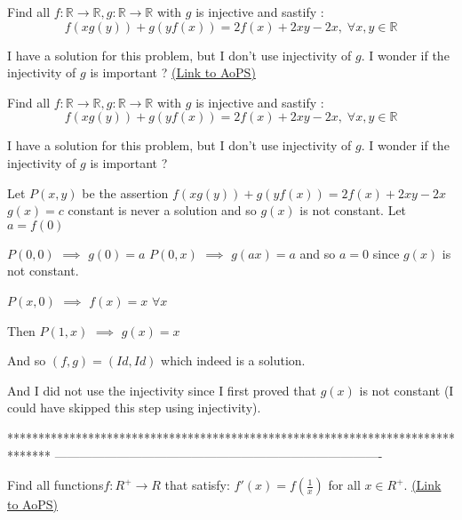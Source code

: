 \begin{problem}
	Find all $f:\mathbb{R}\rightarrow \mathbb{R},g:\mathbb{R}\rightarrow \mathbb{R}$ with $g$ is injective and sastify :
\[f(xg(y))+g(yf(x))=2f(x)+2xy-2x,\;\forall x,y\in \mathbb{R}\]

I have a solution for this problem, but I don't use injectivity of $g$. I wonder if the injectivity of $g$ is important ?
	\flushright \href{https://artofproblemsolving.com/community/c6h607439}{(Link to AoPS)}
\end{problem}



\begin{solution}
	\begin{tcolorbox}Find all $f:\mathbb{R}\rightarrow \mathbb{R},g:\mathbb{R}\rightarrow \mathbb{R}$ with $g$ is injective and sastify :
\[f(xg(y))+g(yf(x))=2f(x)+2xy-2x,\;\forall x,y\in \mathbb{R}\]

I have a solution for this problem, but I don't use injectivity of $g$. I wonder if the injectivity of $g$ is important ?\end{tcolorbox}
Let $P(x,y)$ be the assertion $f(xg(y))+g(yf(x))=2f(x)+2xy-2x$
$g(x)=c$ constant is never a solution and so $g(x)$ is not constant.
Let $a=f(0)$

$P(0,0)$ $\implies$ $g(0)=a$
$P(0,x)$ $\implies$ $g(ax)=a$ and so $a=0$ since $g(x)$ is not constant.

$P(x,0)$ $\implies$ $f(x)=x$ $\forall x$

Then $P(1,x)$ $\implies$ $g(x)=x$

And so $\boxed{(f,g)=(Id,Id)}$ which indeed is a solution.

And I did not use the injectivity since I first proved that $g(x)$ is not constant (I could have skipped this step using injectivity).
\end{solution}
*******************************************************************************
-------------------------------------------------------------------------------

\begin{problem}
	Find all functions$f:R^+\to R$  that satisfy:
$  f'(x)=f(\frac{1}{x}) $ 
 for all $x\in R^+$.
	\flushright \href{https://artofproblemsolving.com/community/c6h607446}{(Link to AoPS)}
\end{problem}



